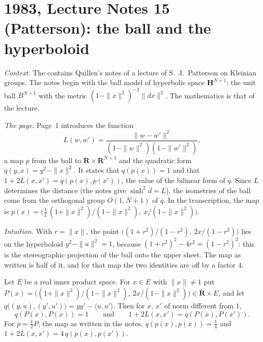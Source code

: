 \section[1983, Lecture Notes 15 (Patterson): the ball and the hyperboloid]{1983, Lecture Notes 15 (Patterson): the ball and the hyperboloid\protect{}}\label{sec:quillen-1983-ln15}

\emph{Context.} The  contains Quillen's notes of a lecture of S.~J.~Patterson on Kleinian groups. The notes begin with the ball model of hyperbolic space $\mathbf H^{N+1}$: the unit ball $B^{N+1}$ with the metric $(1 - \|x\|^2)^{-2}\|dx\|^2$. The mathematics is that of the lecture.

\emph{The page.} Page~1 introduces the function
\[
  L(w, w') = \frac{\|w - w'\|^2}{(1 - \|w\|^2)(1 - \|w'\|^2)},
\]
a map $p$ from the ball to $\mathbf R \times \mathbf R^{N+1}$ and the quadratic form $q(y, x) = y^2 - \|x\|^2$. It states that $q(p(x)) = 1$ and that $1 + 2L(x, x') = q(p(x), p(x'))$, the value of the bilinear form of $q$. Since $L$ determines the distance (the notes give $\sinh^2 d = L$), the isometries of the ball come from the orthogonal group $O(1, N + 1)$ of $q$. In the transcription, the map is $p(x) = \bigl(\tfrac12\,(1 + \|x\|^2)/(1 - \|x\|^2),\ x/(1 - \|x\|^2)\bigr)$.

\emph{Intuition.} With $r = \|x\|$, the point $\bigl((1 + r^2)/(1 - r^2),\ 2x/(1 - r^2)\bigr)$ lies on the hyperboloid $y^2 - \|u\|^2 = 1$, because $(1 + r^2)^2 - 4r^2 = (1 - r^2)^2$: this is the stereographic projection of the ball onto the upper sheet. The map as written is half of it, and for that map the two identities are off by a factor $4$.

\begin{encadre}
\begin{theoreme}\label{thm:quillen-1983-ln15}
Let $E$ be a real inner product space. For $x \in E$ with $\|x\| \ne 1$ put $P(x) = \bigl((1 + \|x\|^2)/(1 - \|x\|^2),\ 2x/(1 - \|x\|^2)\bigr) \in \mathbf R \times E$, and let $q\bigl((y, u), (y', u')\bigr) = yy' - \langle u, u'\rangle$. Then for $x$, $x'$ of norm different from $1$,
\[
  q(P(x), P(x)) = 1 \qquad\text{and}\qquad 1 + 2L(x, x') = q(P(x), P(x')).
\]
For $p = \tfrac12 P$, the map as written in the notes, $q(p(x), p(x)) = \tfrac14$ and $1 + 2L(x, x') = 4\,q(p(x), p(x'))$.
\end{theoreme}
\end{encadre}

